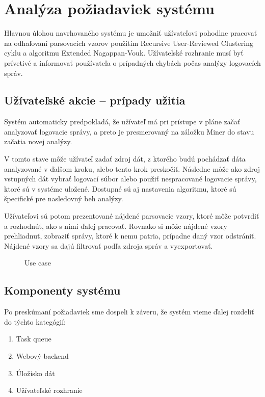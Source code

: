 \chapter{Analýza požiadaviek systému}

Hlavnou úlohou navrhovaného systému je umožniť užívateľovi pohodlne pracovať na odhaľovaní parsovacích vzorov použitím Recursive User-Reviewed Clustering cyklu a algoritmu Extended Nagappan-Vouk. Užívateľské rozhranie musí byť prívetivé a informovať používateľa o prípadných chybách počas analýzy logovacích správ.

\section{Užívateľské akcie -- prípady užitia}

Systém automaticky predpokladá, že užívateľ má pri prístupe v pláne začať analyzovať logovacie správy, a preto je presmerovaný na záložku Miner do stavu začatia novej analýzy. 
\par V tomto stave môže užívateľ zadať zdroj dát, z ktorého budú pochádzať dáta analyzované v ďalšom kroku, alebo tento krok preskočiť. Následne môže ako zdroj vstupných dát vybrať logovací súbor alebo použiť nespracované logovacie správy, ktoré sú v systéme uložené. Dostupné sú aj nastavenia algoritmu, ktoré sú špecifické pre nasledovný beh analýzy. \par Užívateľovi sú potom prezentované nájdené parsovacie vzory, ktoré môže potvrdiť a rozhodnúť, ako s nimi ďalej pracovať. Rovnako si môže nájdené vzory prehliadnuť, zobraziť správy, ktoré k nemu patria, prípadne daný vzor odstrániť. Nájdené vzory sa dajú filtrovať podľa zdroja správ a vyexportovať.

\begin{figure}[htbp]
 \centering 
 \begin{minipage}{0.95\linewidth}
 	\centering
 \end{minipage}
  \caption{Use case }
  \label{fig:use-cases}
\end{figure}

\section{Komponenty systému}
Po preskúmaní požiadaviek sme dospeli k záveru, že systém vieme ďalej rozdeliť do týchto kategógií:

\begin{enumerate}
  \item Task queue
  \item Webový backend
  \item Úložisko dát
  \item Užívateľské rozhranie
\end{enumerate}

